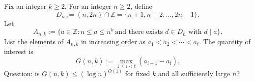 Fix an integer $k\ge 2$. For an integer $n\ge 2$, define
\[
D_n := (n,2n)\cap\mathbb{Z} = \{n+1,n+2,\dots,2n-1\}.
\]
Let
\[
A_{n,k}:=\{a\in\mathbb{Z}: n\le a\le n^k\ \text{and there exists }d\in D_n\text{ with }d\mid a\}.
\]
List the elements of $A_{n,k}$ in increasing order as $a_1<a_2<\cdots<a_t$. The quantity of interest is
\[
G(n,k):=\max_{1\le i<t}(a_{i+1}-a_i).
\]
Question: is $G(n,k)\le (\log n)^{O(1)}$ for fixed $k$ and all sufficiently large $n$?
